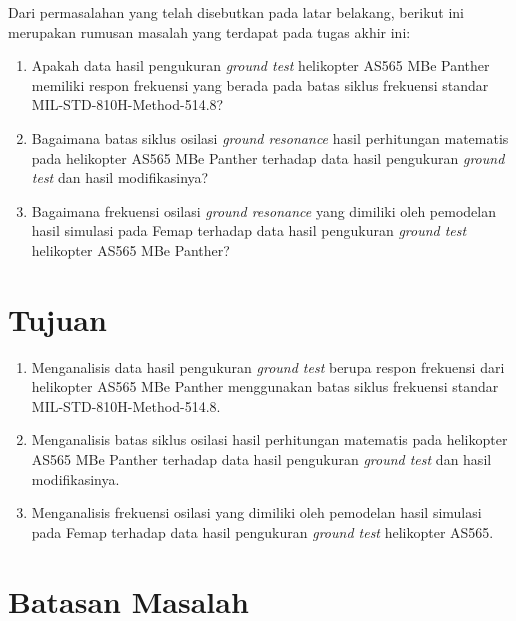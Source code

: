Dari permasalahan yang telah disebutkan pada latar belakang, berikut ini merupakan rumusan masalah yang terdapat pada tugas akhir ini:

\begin{enumerate}[nolistsep]
	
	\item Apakah data hasil pengukuran \textit{ground test} helikopter AS565 MBe Panther memiliki respon frekuensi yang berada pada batas siklus frekuensi standar MIL-STD-810H-Method-514.8?
	
	\item Bagaimana batas siklus osilasi \textit{ground resonance} hasil perhitungan matematis pada helikopter AS565 MBe Panther terhadap data hasil pengukuran \textit{ground test} dan hasil modifikasinya?
	
	\item Bagaimana frekuensi osilasi \textit{ground resonance} yang dimiliki oleh pemodelan hasil simulasi pada Femap terhadap data hasil pengukuran \textit{ground test} helikopter AS565 MBe Panther?

\end{enumerate}

\section{Tujuan}
\label{sec:Tujuan}

\begin{enumerate}[nolistsep]

	\item Menganalisis data hasil pengukuran \textit{ground test} berupa respon frekuensi dari helikopter AS565 MBe Panther menggunakan batas siklus frekuensi standar MIL-STD-810H-Method-514.8.
	
	\item Menganalisis batas siklus osilasi hasil perhitungan matematis pada helikopter AS565 MBe Panther terhadap data hasil pengukuran \textit{ground test} dan hasil modifikasinya.
	
	\item Menganalisis frekuensi osilasi yang dimiliki oleh pemodelan hasil simulasi pada Femap terhadap data hasil pengukuran \textit{ground test} helikopter AS565.

\end{enumerate}

\section{Batasan Masalah}
\label{sec:batasanmasalah}

